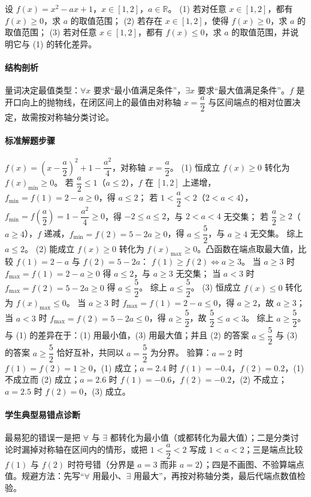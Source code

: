 \begin{problem}
设 $f(x)=x^2-ax+1$，$x\in[1,2]$，$a\in\mathbb R$。
(1) 若对任意 $x\in[1,2]$，都有 $f(x)\ge0$，求 $a$ 的取值范围；
(2) 若存在 $x\in[1,2]$，使得 $f(x)\ge0$，求 $a$ 的取值范围；
(3) 若对任意 $x\in[1,2]$，都有 $f(x)\le0$，求 $a$ 的取值范围，并说明它与 (1) 的转化差异。
\end{problem}
\begin{solution}
\paragraph{结构剖析}
量词决定最值类型：$\forall x$ 要求“最小值满足条件”，$\exists x$ 要求“最大值满足条件”。$f$ 是开口向上的抛物线，在闭区间上的最值由对称轴 $x=\dfrac a2$ 与区间端点的相对位置决定，故需按对称轴分类讨论。
\paragraph{标准解题步骤}
$f(x)=\left(x-\dfrac a2\right)^2+1-\dfrac{a^2}{4}$，对称轴 $x=\dfrac a2$。
(1) 恒成立 $f(x)\ge0$ 转化为 $f(x)_{\min}\ge0$。
若 $\dfrac a2\le1$（$a\le2$），$f$ 在 $[1,2]$ 上递增，$f_{\min}=f(1)=2-a\ge0$，得 $a\le2$；
若 $1<\dfrac a2<2$（$2<a<4$），$f_{\min}=f\!\left(\dfrac a2\right)=1-\dfrac{a^2}4\ge0$，得 $-2\le a\le2$，与 $2<a<4$ 无交集；
若 $\dfrac a2\ge2$（$a\ge4$），$f$ 递减，$f_{\min}=f(2)=5-2a\ge0$，得 $a\le\dfrac52$，与 $a\ge4$ 无交集。
综上 $a\le2$。
(2) 能成立 $f(x)\ge0$ 转化为 $f(x)_{\max}\ge0$。凸函数在端点取最大值，比较 $f(1)=2-a$ 与 $f(2)=5-2a$：
$f(1)\ge f(2)\iff a\ge3$。
当 $a\ge3$ 时 $f_{\max}=f(1)=2-a\ge0$ 得 $a\le2$，与 $a\ge3$ 无交集；
当 $a<3$ 时 $f_{\max}=f(2)=5-2a\ge0$ 得 $a\le\dfrac52$。
综上 $a\le\dfrac52$。
(3) 恒成立 $f(x)\le0$ 转化为 $f(x)_{\max}\le0$。
当 $a\ge3$ 时 $f_{\max}=f(1)=2-a\le0$，得 $a\ge2$，故 $a\ge3$；
当 $a<3$ 时 $f_{\max}=f(2)=5-2a\le0$，得 $a\ge\dfrac52$，故 $\dfrac52\le a<3$。
综上 $a\ge\dfrac52$。与 (1) 的差异在于：(1) 用最小值，(3) 用最大值；并且 (2) 的答案 $a\le\dfrac52$ 与 (3) 的答案 $a\ge\dfrac52$ 恰好互补，共同以 $a=\dfrac52$ 为分界。
验算：$a=2$ 时 $f(1)=f(2)=1\ge0$，(1) 成立；$a=2.4$ 时 $f(1)=-0.4$，$f(2)=0.2$，(1) 不成立而 (2) 成立；$a=2.6$ 时 $f(1)=-0.6$，$f(2)=-0.2$，(2) 不成立；$a=2.5$ 时 $f(2)=0$，(3) 成立。
\paragraph{学生典型易错点诊断}
最易犯的错误一是把 $\forall$ 与 $\exists$ 都转化为最小值（或都转化为最大值）；二是分类讨论时漏掉对称轴在区间内的情形，或把 $1<\dfrac a2<2$ 写成 $1<a<2$；三是端点比较 $f(1)$ 与 $f(2)$ 时符号错（分界是 $a=3$ 而非 $a=2$）；四是不画图、不验算端点值。规避方法：先写“$\forall$ 用最小、$\exists$ 用最大”，再按对称轴分类，最后代端点数值检验。
\end{solution}
